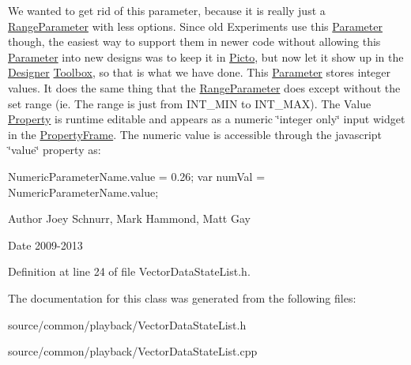 We wanted to get rid of this parameter, because it is really just a \hyperlink{class_picto_1_1_range_parameter}{Range\-Parameter} with less options. Since old Experiments use this \hyperlink{class_picto_1_1_parameter}{Parameter} though, the easiest way to support them in newer code without allowing this \hyperlink{class_picto_1_1_parameter}{Parameter} into new designs was to keep it in \hyperlink{namespace_picto}{Picto}, but now let it show up in the \hyperlink{class_designer}{Designer} \hyperlink{class_toolbox}{Toolbox}, so that is what we have done. This \hyperlink{class_picto_1_1_parameter}{Parameter} stores integer values. It does the same thing that the \hyperlink{class_picto_1_1_range_parameter}{Range\-Parameter} does except without the set range (ie. The range is just from I\-N\-T\-\_\-\-M\-I\-N to I\-N\-T\-\_\-\-M\-A\-X). The Value \hyperlink{class_picto_1_1_property}{Property} is runtime editable and appears as a numeric \char`\"{}integer only\char`\"{} input widget in the \hyperlink{class_property_frame}{Property\-Frame}. The numeric value is accessible through the javascript \char`\"{}value\char`\"{} property as\-: 
\begin{DoxyCode}
NumericParameterName.value = 0.26;
var numVal = NumericParameterName.value;
\end{DoxyCode}
 \begin{DoxyAuthor}{Author}
Joey Schnurr, Mark Hammond, Matt Gay 
\end{DoxyAuthor}
\begin{DoxyDate}{Date}
2009-\/2013 
\end{DoxyDate}


Definition at line 24 of file Vector\-Data\-State\-List.\-h.



The documentation for this class was generated from the following files\-:\begin{DoxyCompactItemize}
\item 
source/common/playback/Vector\-Data\-State\-List.\-h\item 
source/common/playback/Vector\-Data\-State\-List.\-cpp\end{DoxyCompactItemize}
